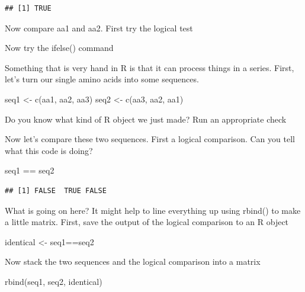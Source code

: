 \documentclass[
]{book}
\newenvironment{Shaded}{\begin{snugshade}}{\end{snugshade}}
\newcommand{\FunctionTok}[1]{\textcolor[rgb]{0.00,0.00,0.00}{#1}}
\newcommand{\NormalTok}[1]{#1}
\newcommand{\OtherTok}[1]{\textcolor[rgb]{0.56,0.35,0.01}{#1}}
\newcommand{\SpecialCharTok}[1]{\textcolor[rgb]{0.00,0.00,0.00}{#1}}
\begin{document}
\begin{verbatim}
## [1] TRUE
\end{verbatim}

Now compare aa1 and aa2. First try the logical test

Now try the ifelse() command

Something that is very hand in R is that it can process things in a series. First, let's turn our single amino acids into some sequences.

\begin{Shaded}
\begin{Highlighting}[]
\NormalTok{seq1 }\OtherTok{\textless{}{-}} \FunctionTok{c}\NormalTok{(aa1, aa2, aa3)}
\NormalTok{seq2 }\OtherTok{\textless{}{-}} \FunctionTok{c}\NormalTok{(aa3, aa2, aa1)}
\end{Highlighting}
\end{Shaded}

Do you know what kind of R object we just made? Run an appropriate check

Now let's compare these two sequences. First a logical comparison. Can you tell what this code is doing?

\begin{Shaded}
\begin{Highlighting}[]
\NormalTok{seq1 }\SpecialCharTok{==}\NormalTok{ seq2}
\end{Highlighting}
\end{Shaded}

\begin{verbatim}
## [1] FALSE  TRUE FALSE
\end{verbatim}

What is going on here? It might help to line everything up using rbind() to make a little matrix. First, save the output of the logical comparison to an R object

\begin{Shaded}
\begin{Highlighting}[]
\NormalTok{identical }\OtherTok{\textless{}{-}}\NormalTok{ seq1}\SpecialCharTok{==}\NormalTok{seq2}
\end{Highlighting}
\end{Shaded}

Now stack the two sequences and the logical comparison into a matrix

\begin{Shaded}
\begin{Highlighting}[]
\FunctionTok{rbind}\NormalTok{(seq1, seq2, identical)}
\end{Highlighting}
\end{Shaded}
\end{document}
